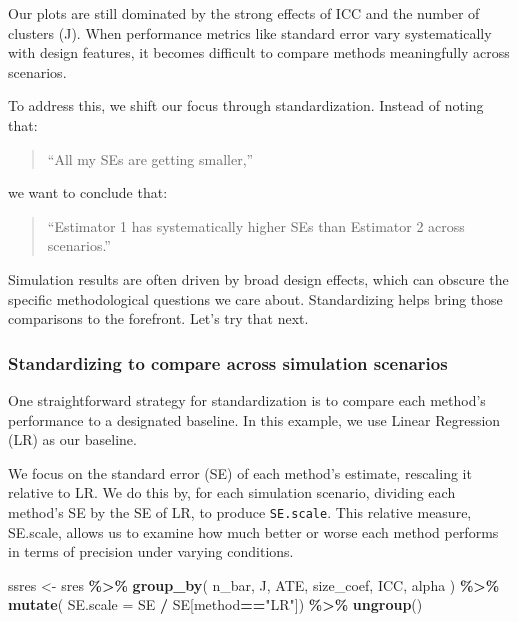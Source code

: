 \documentclass[
]{book}
\newenvironment{Shaded}{\begin{snugshade}}{\end{snugshade}}
\newcommand{\AttributeTok}[1]{\textcolor[rgb]{0.13,0.29,0.53}{#1}}
\newcommand{\FunctionTok}[1]{\textcolor[rgb]{0.13,0.29,0.53}{\textbf{#1}}}
\newcommand{\NormalTok}[1]{#1}
\newcommand{\OtherTok}[1]{\textcolor[rgb]{0.56,0.35,0.01}{#1}}
\newcommand{\SpecialCharTok}[1]{\textcolor[rgb]{0.81,0.36,0.00}{\textbf{#1}}}
\newcommand{\StringTok}[1]{\textcolor[rgb]{0.31,0.60,0.02}{#1}}
\begin{document}
Our plots are still dominated by the strong effects of ICC and the number of clusters (J). When performance metrics like standard error vary systematically with design features, it becomes difficult to compare methods meaningfully across scenarios.

To address this, we shift our focus through standardization. Instead of noting that:

\begin{quote}
``All my SEs are getting smaller,''
\end{quote}

we want to conclude that:

\begin{quote}
``Estimator 1 has systematically higher SEs than Estimator 2 across scenarios.''
\end{quote}

Simulation results are often driven by broad design effects, which can obscure the specific methodological questions we care about. Standardizing helps bring those comparisons to the forefront.
Let's try that next.

\subsubsection{Standardizing to compare across simulation scenarios}\label{standardizing-to-compare-across-simulation-scenarios}

One straightforward strategy for standardization is to compare each method's performance to a designated baseline. In this example, we use Linear Regression (LR) as our baseline.

We focus on the standard error (SE) of each method's estimate, rescaling it relative to LR.
We do this by, for each simulation scenario, dividing each method's SE by the SE of LR, to produce \texttt{SE.scale}.
This relative measure, SE.scale, allows us to examine how much better or worse each method performs in terms of precision under varying conditions.

\begin{Shaded}
\begin{Highlighting}[]
\NormalTok{ssres }\OtherTok{\textless{}{-}} 
\NormalTok{  sres }\SpecialCharTok{\%\textgreater{}\%} 
  \FunctionTok{group\_by}\NormalTok{( n\_bar, J, ATE, size\_coef, ICC, alpha ) }\SpecialCharTok{\%\textgreater{}\%}
  \FunctionTok{mutate}\NormalTok{( }\AttributeTok{SE.scale =}\NormalTok{ SE }\SpecialCharTok{/}\NormalTok{ SE[method}\SpecialCharTok{==}\StringTok{"LR"}\NormalTok{]) }\SpecialCharTok{\%\textgreater{}\%}
  \FunctionTok{ungroup}\NormalTok{()}
\end{Highlighting}
\end{Shaded}
\end{document}
